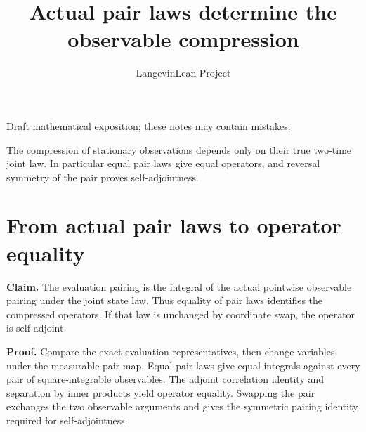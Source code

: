 \documentclass[11pt,a4paper]{article}
\title{\texorpdfstring{Actual pair laws determine the observable compression}{Actual pair laws determine the observable compression}}
\author{LangevinLean Project}
\date{}
\begin{document}
\maketitle
Draft mathematical exposition; these notes may contain mistakes.


The compression of stationary observations depends only on their true two-time joint law. In particular equal pair laws give equal operators, and reversal symmetry of the pair proves self-adjointness.


\section{\texorpdfstring{From actual pair laws to operator equality}{From actual pair laws to operator equality}}


\textbf{Claim.} The evaluation pairing is the integral of the actual pointwise observable pairing under the joint state law. Thus equality of pair laws identifies the compressed operators. If that law is unchanged by coordinate swap, the operator is self-adjoint.



\textbf{Proof.} Compare the exact evaluation representatives, then change variables under the measurable pair map. Equal pair laws give equal integrals against every pair of square-integrable observables. The adjoint correlation identity and separation by inner products yield operator equality. Swapping the pair exchanges the two observable arguments and gives the symmetric pairing identity required for self-adjointness.
\end{document}
